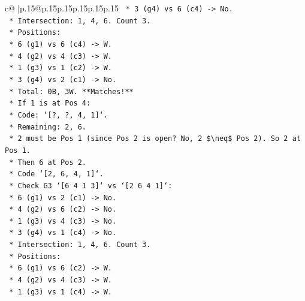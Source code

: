\documentclass{article}
\begin{document}
{\begin{supertabular}{c@{$\;$}|p{.15\linewidth}@{}p{.15\linewidth}p{.15\linewidth}p{.15\linewidth}p{.15\linewidth}p{.15\linewidth}}
{{{\texttt{                            *   3 (g4) vs 6 (c4) {-}> No.} \\
\texttt{                            *   Intersection: 1, 4, 6. Count 3.} \\
\texttt{                            *   Positions:} \\
\texttt{                                *   6 (g1) vs 6 (c4) {-}> W.} \\
\texttt{                                *   4 (g2) vs 4 (c3) {-}> W.} \\
\texttt{                                *   1 (g3) vs 1 (c2) {-}> W.} \\
\texttt{                                *   3 (g4) vs 2 (c1) {-}> No.} \\
\texttt{                                *   Total: 0B, 3W. **Matches!**} \\
\texttt{                *   If 1 is at Pos 4:} \\
\texttt{                    *   Code: `{[}?, ?, 4, 1{]}`.} \\
\texttt{                    *   Remaining: 2, 6.} \\
\texttt{                    *   2 must be Pos 1 (since Pos 2 is open? No, 2 \$\textbackslash{}neq\$ Pos 2). So 2 at Pos 1.} \\
\texttt{                    *   Then 6 at Pos 2.} \\
\texttt{                    *   Code `{[}2, 6, 4, 1{]}`.} \\
\texttt{                    *   Check G3 `{[}6 4 1 3{]}` vs `{[}2 6 4 1{]}`:} \\
\texttt{                        *   6 (g1) vs 2 (c1) {-}> No.} \\
\texttt{                        *   4 (g2) vs 6 (c2) {-}> No.} \\
\texttt{                        *   1 (g3) vs 4 (c3) {-}> No.} \\
\texttt{                        *   3 (g4) vs 1 (c4) {-}> No.} \\
\texttt{                        *   Intersection: 1, 4, 6. Count 3.} \\
\texttt{                        *   Positions:} \\
\texttt{                            *   6 (g1) vs 6 (c2) {-}> W.} \\
\texttt{                            *   4 (g2) vs 4 (c3) {-}> W.} \\
\texttt{                            *   1 (g3) vs 1 (c4) {-}> W.} \\
}}}
\end{supertabular}}
\end{document}
